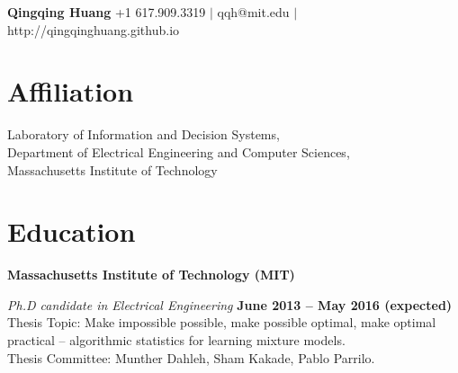 \documentclass[margin,line,11pt]{resume}
\begin{document}
{\Large \textbf{Qingqing Huang}}\hspace{52mm}
{\footnotesize +1 617.909.3319 $\vert$ qqh@mit.edu  $\vert$ http://qingqinghuang.github.io}
\begin{resume}





  \section{\mysidestyle Affiliation}
  Laboratory of Information and Decision Systems, \\
  Department of Electrical Engineering and Computer Sciences,\\
  Massachusetts Institute of Technology

  \vspace{-12pt}
  \section{\mysidestyle Education}
  \textbf{Massachusetts Institute of Technology (MIT)}

  \vspace{-12pt}
  \textsl{Ph.D candidate in Electrical Engineering} \hfill \textbf{June 2013 -- May 2016
    (expected)}
  \\
  {Thesis Topic}: Make impossible possible, make possible optimal, make optimal practical
  -- algorithmic statistics for learning mixture models.
  \\
  {Thesis Committee}: Munther Dahleh, Sham Kakade, Pablo Parrilo.


\end{resume}
\end{document}
